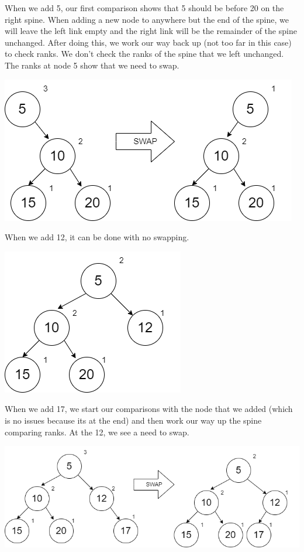 \documentclass[
]{book}
\begin{document}
When we add 5, our first comparison shows that 5 should be before 20 on the right spine. When adding a new node to anywhere but the end of the spine, we will leave the left link empty and the right link will be the remainder of the spine unchanged. After doing this, we work our way back up (not too far in this case) to check ranks. We don't check the ranks of the spine that we left unchanged. The ranks at node 5 show that we need to swap.

\includegraphics{images/heap5.drawio.png}

When we add 12, it can be done with no swapping.

\includegraphics{images/heap6.drawio.png}

When we add 17, we start our comparisons with the node that we added (which is no issues because its at the end) and then work our way up the spine comparing ranks. At the 12, we see a need to swap.

\includegraphics{images/heap7.drawio.png}
\end{document}
